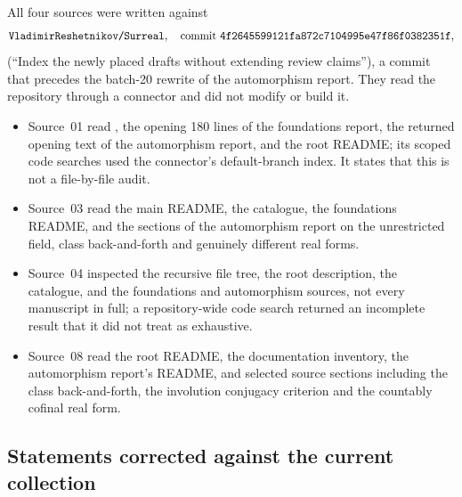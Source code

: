 \documentclass[11pt,letterpaper]{article}
\numberwithin{equation}{section}
\theoremstyle{definition}
\theoremstyle{remark}
\newcommand{\fullhash}{\texttt{4f264559\allowbreak 9121fa87\allowbreak 2c710499\allowbreak 5e47f86f\allowbreak 0382351f}}
\newcommand{\repo}{\texttt{VladimirReshetnikov/Surreal}}
\begin{document}
All four sources were written against
\[
 \repo,\quad\text{commit }\fullhash,
\]
(``Index the newly placed drafts without extending review claims''), a commit
that precedes the batch-20 rewrite of the automorphism report. They read the repository
through a connector and did not modify or build it.
\begin{itemize}
\item Source~01 read , the opening 180 lines of the
foundations report, the returned opening text of the automorphism report, and
the root README; its scoped code searches used the connector's default-branch
index. It states that this is not a file-by-file audit.
\item Source~03 read the main README, the catalogue, the foundations README, and
the sections of the automorphism report on the unrestricted field, class
back-and-forth and genuinely different real forms.
\item Source~04 inspected the recursive file tree, the root description, the
catalogue, and the foundations and automorphism sources, not every manuscript
in full; a repository-wide code search returned an incomplete result that it did
not treat as exhaustive.
\item Source~08 read the root README, the documentation inventory, the
automorphism report's README, and selected source sections including the class
back-and-forth, the involution conjugacy criterion and the countably cofinal
real form.
\end{itemize}

\subsection{Statements corrected against the current collection}
\end{document}
